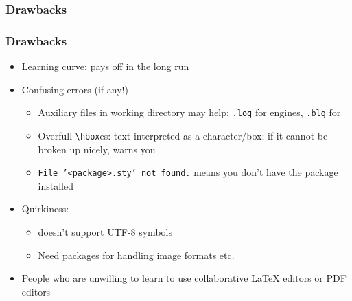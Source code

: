 \documentclass[xetex,colorlinks]{beamer} %
\begin{document}
  \subsubsection{Drawbacks}
  \begin{frame}
    \frametitle{Drawbacks}
    \begin{itemize}
     \item Learning curve: pays off in the long run
     \item Confusing errors (if any!)
     \begin{itemize}
      \item Auxiliary files in working directory may help: \texttt{.log} for engines, \texttt{.blg} for 
      \item Overfull \texttt{\textbackslash{}hbox}es: text interpreted as a character/box; if it cannot be broken up nicely, warns you
      \item \texttt{File '<package>.sty' not found.} means you don't have the package installed
     \end{itemize}
     \item Quirkiness:
     \begin{itemize}
      \item {} doesn’t support UTF-8 symbols
      \item Need packages for handling image formats etc.
     \end{itemize}
     \item People who are unwilling to learn to use collaborative \LaTeX{} editors or PDF editors
    \end{itemize}
    \centering
    
  \end{frame}
  
\end{document}
